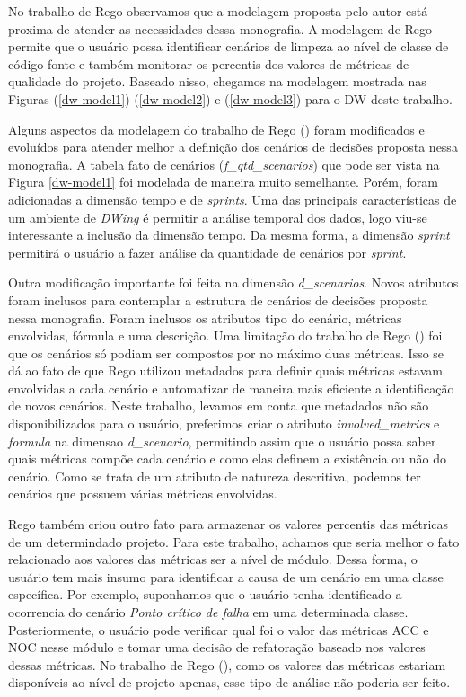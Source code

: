 No trabalho de Rego \citeyear{rego2014} observamos que a modelagem proposta pelo autor está proxima de atender as necessidades dessa monografia. A modelagem de Rego \citeyear{rego2014} permite que o usuário possa identificar cenários de limpeza ao nível de classe de código fonte e também monitorar os percentis dos valores de métricas de qualidade do projeto. Baseado nisso, chegamos na modelagem mostrada nas Figuras (\ref{dw-model1}) (\ref{dw-model2}) e (\ref{dw-model3}) para o DW deste trabalho.

Alguns aspectos da modelagem do trabalho de Rego (\citeyear{rego2014}) foram modificados e evoluídos para atender melhor a definição dos cenários de decisões proposta nessa monografia. A tabela fato de cenários (\emph{f\_qtd\_scenarios}) que pode ser vista na Figura \ref{dw-model1}  foi modelada de maneira muito semelhante. Porém, foram adicionadas a dimensão tempo e de \emph{sprints}. Uma das principais características de um ambiente de \emph{DWing} é permitir a análise temporal dos dados, logo viu-se interessante a inclusão da dimensão tempo. Da mesma forma, a dimensão \emph{sprint} permitirá o usuário a fazer análise da quantidade de cenários por \emph{sprint}. 

Outra modificação importante foi feita na dimensão \emph{d\_scenarios}. Novos atributos foram inclusos para contemplar a estrutura de cenários de decisões proposta nessa monografia. Foram inclusos os atributos tipo do cenário, métricas envolvidas, fórmula e uma descrição. Uma limitação do trabalho de Rego (\citeyear{rego2014}) foi que os cenários só podiam ser compostos por no máximo duas métricas. Isso se dá ao fato de que Rego utilizou  metadados para definir quais métricas estavam envolvidas a cada cenário e automatizar de maneira mais eficiente a identificação de novos cenários. Neste trabalho, levamos em conta que  metadados não são disponibilizados para o usuário, preferimos criar o atributo \emph{involved\_metrics} e \emph{formula} na dimensao \emph{d\_scenario}, permitindo assim que o usuário possa saber quais métricas compõe cada cenário e como elas definem a existência ou não do cenário. Como se trata de um atributo de natureza descritiva, podemos ter cenários que possuem várias métricas envolvidas.

Rego também criou outro fato para armazenar os valores percentis das métricas de um determindado projeto. Para este trabalho, achamos que seria melhor o fato relacionado aos valores das métricas ser a nível de módulo. Dessa forma, o usuário tem mais insumo para identificar a causa de um cenário em uma classe específica. Por exemplo, suponhamos que o usuário tenha identificado a ocorrencia do cenário \emph{Ponto crítico de falha} em uma determinada classe. Posteriormente, o usuário pode verificar qual foi o valor das métricas ACC e NOC nesse módulo e tomar uma decisão de refatoração baseado nos valores dessas métricas. No trabalho de Rego (\citeyear{rego2014}), como os valores das métricas estariam disponíveis ao nível de projeto apenas, esse tipo de análise não poderia ser feito.

